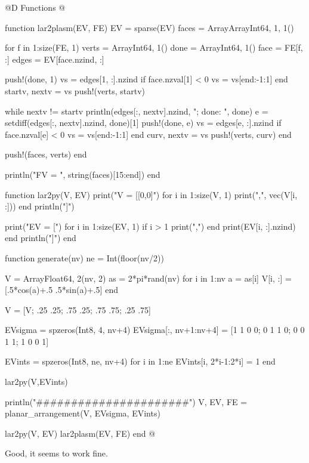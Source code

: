\documentclass[10pt]{book}
\begin{document}
@D Functions
@{function lar2plasm(EV, FE)
    EV = sparse(EV)
    faces = Array{Array{Int64, 1}, 1}()

    for f in 1:size(FE, 1)
        verts = Array{Int64, 1}()
        done = Array{Int64, 1}()
        face = FE[f, :]
        edges = EV[face.nzind, :]

        push!(done, 1)
        vs = edges[1, :].nzind
        if face.nzval[1] < 0
            vs = vs[end:-1:1]
        end
        startv, nextv = vs
        push!(verts, startv)

        while nextv != startv
            println(edges[:, nextv].nzind, "; done: ", done)
            e = setdiff(edges[:, nextv].nzind, done)[1]
            push!(done, e)
            vs = edges[e, :].nzind
            if face.nzval[e] < 0
                vs = vs[end:-1:1]
            end
            curv, nextv = vs
            push!(verts, curv)
        end

        push!(faces, verts)
    end

    println("FV = ", string(faces)[15:end])
end

function lar2py(V, EV)
    print("V = [[0,0]")
    for i in 1:size(V, 1)
        print(",", vec(V[i, :]))
    end
    println("]")
    
    print("EV = [")
    for i in 1:size(EV, 1)
        if i > 1 print(",") end
        print(EV[i, :].nzind)
    end
    println("]")
end

function generate(nv)
    ne = Int(floor(nv/2))
    
    V = Array{Float64, 2}(nv, 2)
    as = 2*pi*rand(nv)
    for i in 1:nv
        a = as[i]
        V[i, :] = [.5*cos(a)+.5 .5*sin(a)+.5]
    end
    
    V = [V; .25 .25; .75 .25; .75 .75; .25 .75]
    

    EVsigma = spzeros(Int8, 4, nv+4)
    EVsigma[:, nv+1:nv+4] = [1 1 0 0; 0 1 1 0; 0 0 1 1; 1 0 0 1]

    EVints = spzeros(Int8, ne, nv+4)
    for i in 1:ne
        EVints[i, 2*i-1:2*i] = 1
    end
    
    lar2py(V,EVints)
    
    println("######################")
    V, EV, FE = planar_arrangement(V, EVsigma, EVints)
    
    lar2py(V, EV)
    lar2plasm(EV, FE)
end
@}


Good, it seems to work fine.


\backmatter


{}

\end{document}

